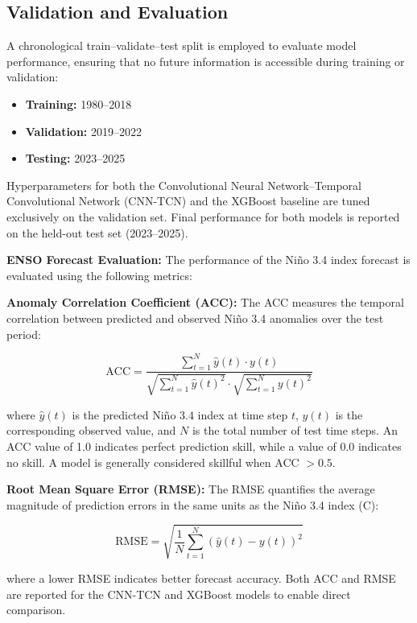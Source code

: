\subsection{Validation and Evaluation}
A chronological train--validate--test split is employed to evaluate model performance, ensuring that no future information is accessible during training or validation:

\begin{itemize}
    \item \textbf{Training:} 1980--2018
    \item \textbf{Validation:} 2019--2022
    \item \textbf{Testing:} 2023--2025
\end{itemize}

\noindent Hyperparameters for both the Convolutional Neural Network--Temporal Convolutional Network (CNN-TCN) and the XGBoost baseline are tuned exclusively on the validation set. Final performance for both models is reported on the held-out test set (2023--2025).

\textbf{ENSO Forecast Evaluation:} The performance of the Ni\~{n}o 3.4 index forecast is evaluated using the following metrics:

\textbf{Anomaly Correlation Coefficient (ACC):}
The ACC measures the temporal correlation between predicted and observed Ni\~{n}o 3.4 anomalies over the test period:

\begin{equation}
\text{ACC} = \frac{\sum_{t=1}^{N} \hat{y}(t) \cdot y(t)}{\sqrt{\sum_{t=1}^{N} \hat{y}(t)^{2}} \cdot \sqrt{\sum_{t=1}^{N} y(t)^{2}}}
\end{equation}

\noindent where $\hat{y}(t)$ is the predicted Ni\~{n}o 3.4 index at time step $t$, $y(t)$ is the corresponding observed value, and $N$ is the total number of test time steps. An ACC value of 1.0 indicates perfect prediction skill, while a value of 0.0 indicates no skill. A model is generally considered skillful when ACC $> 0.5$.

\textbf{Root Mean Square Error (RMSE):}
The RMSE quantifies the average magnitude of prediction errors in the same units as the Ni\~{n}o 3.4 index (\degree C):

\begin{equation}
\text{RMSE} = \sqrt{\frac{1}{N} \sum_{t=1}^{N} \left( \hat{y}(t) - y(t) \right)^{2}}
\end{equation}

\noindent where a lower RMSE indicates better forecast accuracy. Both ACC and RMSE are reported for the CNN-TCN and XGBoost models to enable direct comparison.

